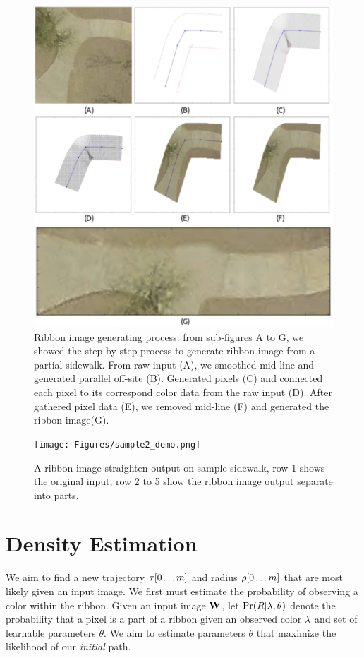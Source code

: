 \begin{figure}[H]
    \centering
    \includegraphics[width=\textwidth]{Figures/straghten.pdf}
    \caption[Ribbon Image Generation]{Ribbon image generating process: from sub-figures A to G, we showed the step by step process to generate ribbon-image from a partial sidewalk. From raw input (A), we smoothed mid line and generated parallel off-site (B). Generated pixels (C) and connected each pixel to its correspond color data from the raw input (D). After gathered pixel data (E), we removed mid-line (F) and generated the ribbon image(G).}
    \label{fig:StraightenProcess}
\end{figure}

\begin{figure}
    \centering
    \texttt{[image: Figures/sample2\_demo.png]}
    \caption[Sample Sidewalk 2]{A ribbon image straighten output on sample sidewalk, row 1 shows the original input, row 2 to 5 show the ribbon image output separate into parts.}
    \label{fig:Sample_Sidewalk_2}
\end{figure}

\section{Density Estimation}\label{sec:density-estimation}
We aim to find a new trajectory $\tau{}[0\dots m]$ and radius $\rho{}[0\dots m]$ that are most likely given an input image. We first must estimate the probability of observing a color within the ribbon.  
Given an input image $\mathbf{W}{}$, let $\Pr(R|\lambda{},\theta)$ denote the probability that a pixel is a part of a ribbon given an observed color $\lambda{}$ and set of learnable parameters $\theta$. 
We aim to estimate parameters $\theta$ that maximize the likelihood of our \textit{initial} path. 

